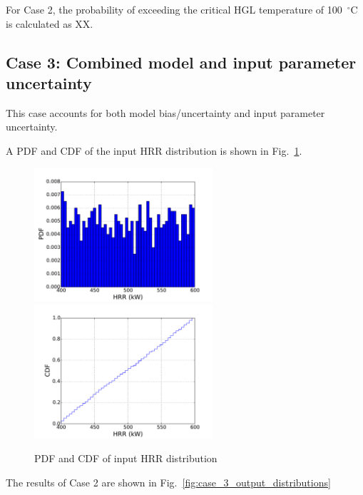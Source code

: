 \documentclass[12pt]{article}
\begin{document}
For Case 2, the probability of exceeding the critical HGL temperature of 100~$^\circ$C is calculated as XX.

\subsection{Case 3: Combined model and input parameter uncertainty}

This case accounts for both model bias/uncertainty and input parameter uncertainty.

A PDF and CDF of the input HRR distribution is shown in Fig.~\ref{fig:case_3_input_distributions}.
\begin{figure}[!ht]
\includegraphics[width=2.6in]{Figures/input_PDF}
\includegraphics[width=2.6in]{Figures/input_CDF}
\caption{PDF and CDF of input HRR distribution}
\label{fig:case_3_input_distributions}
\end{figure}

The results of Case 2 are shown in Fig.~\ref{fig:case_3_output_distributions}
\end{document}
